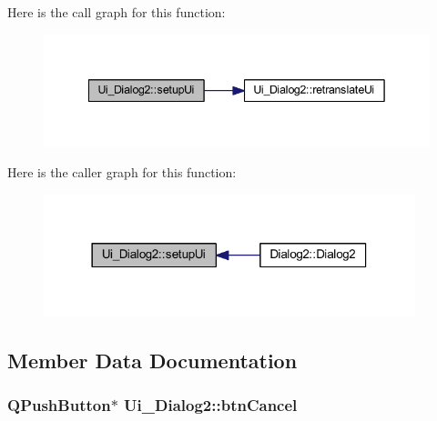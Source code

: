 Here is the call graph for this function\+:
\nopagebreak
\begin{figure}[H]
\begin{center}
\leavevmode
\includegraphics[width=342pt]{de/d0e/class_ui___dialog2_a6844bf81dbbb01d6eb47136862dccaa8_cgraph}
\end{center}
\end{figure}




Here is the caller graph for this function\+:
\nopagebreak
\begin{figure}[H]
\begin{center}
\leavevmode
\includegraphics[width=306pt]{de/d0e/class_ui___dialog2_a6844bf81dbbb01d6eb47136862dccaa8_icgraph}
\end{center}
\end{figure}




\subsection{Member Data Documentation}
\hypertarget{class_ui___dialog2_ae564e70ef17efd3c6862c0eb75eb72ca}{}
\subsubsection[{btn\+Cancel}]{\setlength{\rightskip}{0pt plus 5cm}Q\+Push\+Button$\ast$ Ui\+\_\+\+Dialog2\+::btn\+Cancel}\label{class_ui___dialog2_ae564e70ef17efd3c6862c0eb75eb72ca}
\hypertarget{class_ui___dialog2_a5b84762f1272faea5a7ea2bef366ac28}{}
